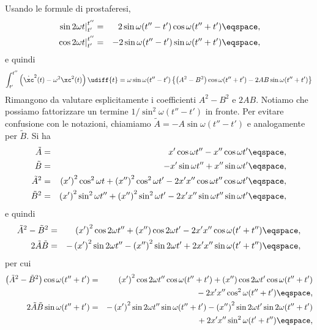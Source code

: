Usando le formule di prostaferesi,
\begin{eqnarray*}
\left. \sin 2\omega t \right|_{t'}^{t''} &=& 2 \sin \omega (t''-t') \cos \omega
(t''+t') \eqspace, \\
\left. \cos 2\omega t \right|_{t'}^{t''} &=& -2 \sin \omega (t''-t') \sin \omega
(t''+t') \eqspace, 
\end{eqnarray*}
e quindi
\begin{displaymath}
\int_{t'}^{t''} \left( \dot{\xc}^{2} (t) - \omega^{2} \xc^{2}(t) \right)
\udiff{t} =
\omega \sin \omega (t'' -t') \left\{ \left( A^{2} - B^{2} \right) \cos \omega
(t'' + t')  -2 AB \sin \omega (t''+t') \right\}
\end{displaymath}
Rimangono da valutare esplicitamente i coefficienti $A^{2} - B^{2}$ e $ 2AB$.
Notiamo che possiamo fattorizzare un termine $1/ \sin^{2} \omega (t''-t')$ in
fronte. Per evitare confusione con le notazioni, chiamiamo 
$\tilde{A} = -A \sin \omega (t''-t') $ e analogamente per  $\tilde{B}$.
Si ha
\begin{eqnarray*}
\tilde{A} &=& x' \cos \omega t'' - x'' \cos \omega t' \eqspace, \\
\tilde{B} &=& -x' \sin \omega t'' + x'' \sin \omega t' \eqspace, \\
\tilde{A}^{2} &=& 
\left( x'\right)^{2} \cos^{2} \omega t + \left( x''\right)^{2} \cos^{2} \omega
t' - 2 x' x'' \cos \omega t'' \cos \omega t ' \eqspace, \\
\tilde{B}^{2} &=& 
\left( x'\right)^{2} \sin^{2} \omega t'' + \left( x''\right)^{2} \sin^{2} \omega
t' - 2x'x'' \sin \omega t'' \sin \omega t' \eqspace,
\end{eqnarray*}
e quindi
\begin{eqnarray*}
\tilde{A}^{2} - \tilde{B}^{2} &=&
\left( x'\right)^{2} \cos 2\omega t'' + \left( x''\right) \cos 2 \omega t' -
2x'x'' \cos \omega (t'+t'') \eqspace, \\
 2 \tilde{A} \tilde{B} &=& - \left( x'\right)^{2} \sin 2 \omega t''  -
\left( x''\right)^{2} \sin 2 \omega t ' +  2 x'x'' \sin \omega
(t'+t'') \eqspace ,
\end{eqnarray*}
per cui
\begin{eqnarray*}
\left( \tilde{A}^{2} - \tilde{B}^{2}\right) \cos \omega (t''+t')  &=&
\left( x'\right)^{2} \cos 2\omega t'' \cos \omega (t''+t') + \left( x''\right)
\cos 2 \omega t' \cos \omega (t''+t') \\
&&{} -
2x'x'' \cos^{2} \omega (t''+t') \eqspace, \\
 2 \tilde{A} \tilde{B} \sin \omega (t''+t') &=& - \left( x'\right)^{2} \sin 2
\omega t'' \sin \omega (t''+t') - 
\left( x''\right)^{2} \sin  2 \omega t ' \sin  2 \omega (t''+ t') \\
&&{}  +  2 x'x'' \sin^{2} \omega
(t'+t'') \eqspace ,
\end{eqnarray*}
